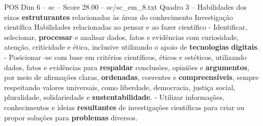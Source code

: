\begin{textsample}{POS Dim 6 – sc – Score 28.00 – sc/sc\_em\_8.txt}
Quadro 3 – Habilidades dos eixos \textbf{estruturantes} relacionadas às áreas do conhecimento Investigação científica Habilidades relacionadas ao pensar e ao fazer científico - Identificar, selecionar, \textbf{processar} e analisar dados, fatos e evidências com curiosidade, atenção, criticidade e ética, inclusive utilizando o apoio de \textbf{tecnologias} \textbf{digitais}. - Posicionar -se com base em critérios científicos, éticos e estéticos, utilizando dados, fatos e evidências para \textbf{respaldar} conclusões, opiniões e \textbf{argumentos}, por meio de afirmações claras, \textbf{ordenadas}, coerentes e \textbf{compreensíveis}, sempre respeitando valores universais, como liberdade, democracia, justiça social, pluralidade, solidariedade e \textbf{sustentabilidade}. - Utilizar informações, conhecimentos e ideias \textbf{resultantes} de investigações científicas para criar ou propor soluções para \textbf{problemas} diversos.

\end{textsample}
